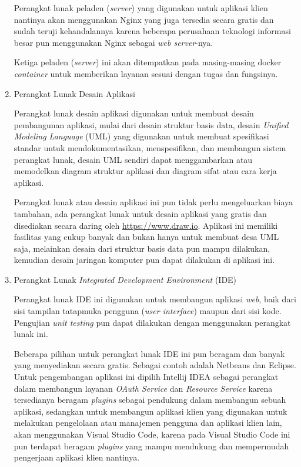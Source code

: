 \documentclass[pdftex,12pt, oneside]{article}
\begin{document}
\begin{enumerate}
Perangkat lunak peladen (\textit{server}) yang digunakan untuk aplikasi klien nantinya akan menggunakan Nginx yang juga tersedia secara gratis dan sudah teruji kehandalannya karena beberapa perusahaan teknologi informasi besar pun menggunakan Nginx sebagai \textit{web server}-nya.

Ketiga peladen (\textit{server}) ini akan ditempatkan pada masing-masing docker \textit{container} untuk memberikan layanan sesuai dengan tugas dan fungsinya.

	\item Perangkat Lunak Desain Aplikasi
	
Perangkat lunak desain aplikasi digunakan untuk membuat desain pembangunan aplikasi, mulai dari desain struktur basis data, desain \textit{Unified Modeling Language} (UML) yang digunakan untuk membuat spesifikasi standar untuk mendokumentasikan, menspesifikan, dan membangun sistem perangkat lunak, desain UML sendiri dapat menggambarkan atau memodelkan diagram struktur aplikasi dan diagram sifat atau cara kerja aplikasi.

Perangkat lunak atau desain aplikasi ini pun tidak perlu mengeluarkan biaya tambahan, ada perangkat lunak untuk desain aplikasi yang gratis dan disediakan secara daring oleh \href{https://www.draw.io}{https://www.draw.io}. Aplikasi ini memiliki fasilitas yang cukup banyak dan bukan hanya untuk membuat desa UML saja, melainkan desain dari struktur basis data pun mampu dilakukan, kemudian desain jaringan komputer pun dapat dilakukan di aplikasi ini.

	\item Perangkat Lunak \textit{Integrated Development Environment} (IDE)
	
Perangkat lunak IDE ini digunakan untuk membangun aplikasi \textit{web}, baik dari sisi tampilan tatapmuka pengguna (\textit{user interface}) maupun dari sisi kode. Pengujian \textit{unit testing} pun dapat dilakukan dengan menggunakan perangkat lunak ini.

Beberapa pilihan untuk perangkat lunak IDE ini pun beragam dan banyak yang menyediakan secara gratis. Sebagai contoh adalah Netbeans dan Eclipse. Untuk pengembangan aplikasi ini dipilih Intellij IDEA sebagai perangkat dalam membangun layanan \textit{OAuth Service} dan \textit{Resource Service} karena tersedianya beragam \textit{plugins} sebagai pendukung dalam membangun sebuah aplikasi, sedangkan untuk membangun aplikasi klien yang digunakan untuk melakukan pengelolaan atau manajemen pengguna dan aplikasi klien lain, akan menggunakan Visual Studio Code, karena pada Visual Studio Code ini pun terdapat beragam \textit{plugins} yang mampu mendukung dan mempermudah pengerjaan aplikasi klien nantinya.


\end{enumerate}
\end{document}
